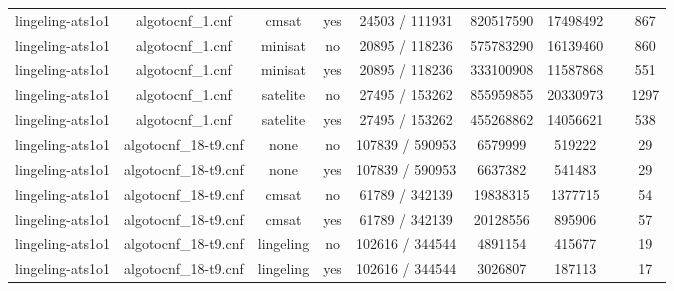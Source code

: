 \begin{appendices}
\begin{table}[p]
\begin{center}
\begin{tabular}{l|cccccccc}
  lingeling-ats1o1               & algotocnf\_1.cnf               & cmsat      & yes   & 24503 / 111931 & 820517590 & 17498492  &            & 867 \\ %
  lingeling-ats1o1               & algotocnf\_1.cnf               & minisat    & no    & 20895 / 118236 & 575783290 & 16139460  &            & 860 \\ %
  lingeling-ats1o1               & algotocnf\_1.cnf               & minisat    & yes   & 20895 / 118236 & 333100908 & 11587868  &            & 551 \\ %
  lingeling-ats1o1               & algotocnf\_1.cnf               & satelite   & no    & 27495 / 153262 & 855959855 & 20330973  &            & 1297 \\ %
  lingeling-ats1o1               & algotocnf\_1.cnf               & satelite   & yes   & 27495 / 153262 & 455268862 & 14056621  &            & 538 \\ %
  lingeling-ats1o1               & algotocnf\_18-t9.cnf           & none       & no    & 107839 / 590953 & 6579999   & 519222    &            & 29 \\ %
  lingeling-ats1o1               & algotocnf\_18-t9.cnf           & none       & yes   & 107839 / 590953 & 6637382   & 541483    &            & 29 \\ %
  lingeling-ats1o1               & algotocnf\_18-t9.cnf           & cmsat      & no    & 61789 / 342139 & 19838315  & 1377715   &            & 54 \\ %
  lingeling-ats1o1               & algotocnf\_18-t9.cnf           & cmsat      & yes   & 61789 / 342139 & 20128556  & 895906    &            & 57 \\ %
  lingeling-ats1o1               & algotocnf\_18-t9.cnf           & lingeling  & no    & 102616 / 344544 & 4891154   & 415677    &            & 19 \\ %
  lingeling-ats1o1               & algotocnf\_18-t9.cnf           & lingeling  & yes   & 102616 / 344544 & 3026807   & 187113    &            & 17 \\ %

\end{tabular}
\end{center}
\end{table}
\end{appendices}
